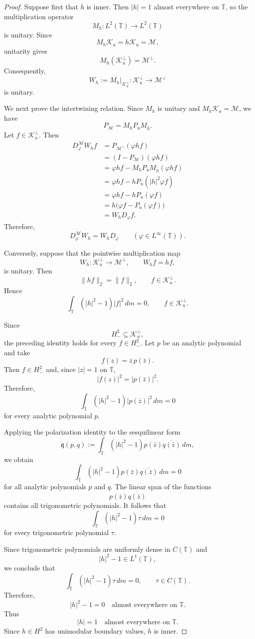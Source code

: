 \documentclass[10pt,a4paper]{amsart}
\def \T{\mathbb{T}}
\newcommand{\clm}{\mathcal{M}}
\newcommand{\clk}{\mathcal{K}}
\newcommand{\vp}{\varphi}
\newcommand\restr[2]{\ensuremath{\left.#1\right|_{#2}}}
\numberwithin{equation}{section}
\begin{document}
\begin{proof}
Suppose first that $h$ is inner. Then $|h|=1$ almost everywhere on
$\T$, so the multiplication operator
\[
M_h:L^2(\T)\longrightarrow L^2(\T)
\]
is unitary. Since
\[
M_h\clk_u=h\clk_u=\clm,
\]
unitarity gives
\[
M_h(\clk_u^\perp)=\clm^\perp.
\]
Consequently,
\[
W_h:=\restr{M_h}{\clk_u^\perp}:
\clk_u^\perp\longrightarrow\clm^\perp
\]
is unitary.

We next prove the intertwining relation. Since $M_h$ is unitary and
$M_h\clk_u=\clm$, we have
\[
P_\clm=M_hP_uM_{\bar h}.
\]
Let $f\in\clk_u^\perp$. Then
\begin{align*}
D_\vp^\clm W_hf
&=
P_{\clm^\perp}(\vp hf)\\
&=
(I-P_\clm)(\vp hf)\\
&=
\vp hf-M_hP_uM_{\bar h}(\vp hf)\\
&=
\vp hf-hP_u(|h|^2\vp f)\\
&=
\vp hf-hP_u(\vp f)\\
&=
h\bigl(\vp f-P_u(\vp f)\bigr)\\
&=
W_hD_\vp f.
\end{align*}
Therefore,
\[
D_\vp^\clm W_h=W_hD_\vp
\qquad
(\vp\in L^\infty(\T)).
\]

Conversely, suppose that the pointwise multiplication map
\[
W_h:\clk_u^\perp\longrightarrow\clm^\perp,
\qquad
W_hf=hf,
\]
is unitary. Then
\[
\|hf\|_2=\|f\|_2,
\qquad
f\in\clk_u^\perp.
\]
Hence
\[
\int_\T (|h|^2-1)|f|^2\,dm=0,
\qquad
f\in\clk_u^\perp.
\]

Since
\[
H_{-}^2\subseteq\clk_u^\perp,
\]
the preceding identity holds for every $f\in H_{-}^2$. Let $p$ be an analytic polynomial and take
\[
f(z)=\bar z\,p(\bar z).
\]
Then $f\in H_{-}^2$ and, since $|z|=1$ on $\T$,
\[
|f(z)|^2=|p(\bar z)|^2.
\]
Therefore,
\[
\int_\T (|h|^2-1)|p(\bar z)|^2\,dm=0
\]
for every analytic polynomial $p$.

Applying the polarization identity to the sesquilinear form
\[
\mathfrak q(p,q)
:=
\int_\T
(|h|^2-1)p(\bar z)\overline{q(\bar z)}\,dm,
\]
we obtain
\[
\int_\T
(|h|^2-1)p(\bar z)\overline{q(\bar z)}\,dm
=
0
\]
for all analytic polynomials $p$ and $q$. The linear span of the
functions
\[
p(\bar z)\overline{q(\bar z)}
\]
contains all trigonometric polynomials. It follows that
\[
\int_\T (|h|^2-1)\tau\,dm=0
\]
for every trigonometric polynomial $\tau$.

Since trigonometric polynomials are uniformly dense in $C(\T)$ and
\[
|h|^2-1\in L^1(\T),
\]
we conclude that
\[
\int_\T (|h|^2-1)\tau\,dm=0,
\qquad
\tau\in C(\T).
\]
Therefore,
\[
|h|^2-1=0
\quad\text{almost everywhere on }\T.
\]
Thus
\[
|h|=1
\quad\text{almost everywhere on }\T.
\]
Since $h\in H^2$ has unimodular boundary values, $h$ is inner.
\end{proof}
\end{document}
